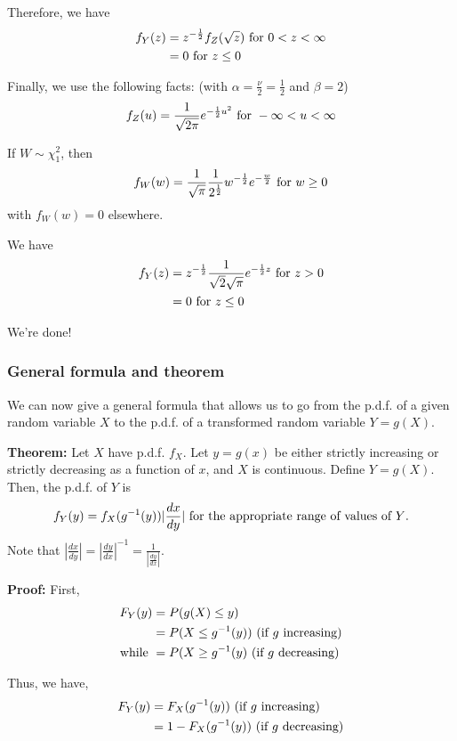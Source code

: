 \documentclass[12pt]{article}
\begin{document}
Therefore, we have
\begin{align*}
    f_Y (z) &= z^{-\frac{1}{2}} f_Z (\sqrt{z}) \textnormal{ for } 0 < z < \infty \\
        &= 0 \textnormal{ for } z \leq 0
\end{align*}

Finally, we use the following facts: (with $\alpha = \frac{\nu}{2} = \frac{1}{2}$ and $\beta = 2$)
\[
    f_Z (u) = \frac{1}{\sqrt{2\pi}} e^{-\frac{1}{2} u^2} \textnormal{ for } -\infty < u < \infty
\]

If $W \sim \chi_1^2$, then
\[
    f_W (w) = \frac{1}{\sqrt{\pi}} \frac{1}{2^{\frac{1}{2}}} w^{-\frac{1}{2}} e^{-\frac{w}{2}} \textnormal{ for } w \geq 0
\]
with $f_W (w) = 0$ elsewhere.

We have
\begin{align*}
    f_Y (z) &= z^{-\frac{1}{2}} \frac{1}{\sqrt{2} \sqrt{\pi}} e^{-\frac{1}{2} z} \textnormal{ for } z > 0 \\
        &= 0 \textnormal{ for } z \leq 0
\end{align*}

We're done!

\subsubsection{General formula and theorem}
We can now give a general formula that allows us to go from the p.d.f. of a given random variable $X$ to the p.d.f. of a transformed random variable $Y = g(X)$.

\textbf{Theorem:} Let $X$ have p.d.f. $f_X$. Let $y = g(x)$ be either strictly increasing or strictly decreasing as a function of $x$, and $X$ is continuous. Define $Y = g(X)$. Then, the p.d.f. of $Y$ is
\[
    f_Y (y) = f_X (g^{-1} (y)) |\frac{dx}{dy}| \textnormal{ for the appropriate range of values of $Y$.}
\]
Note that $\displaystyle |\frac{dx}{dy}| = |\frac{dy}{dx}|^{-1} = \frac{1}{|\frac{dy}{dx}|}$.

\textbf{Proof:} First, 
\begin{align*}
    F_Y (y) &= P(g(X) \leq y) \\
        &= P(X \leq g^{-1}(y)) \textnormal{ (if $g$ increasing)} \\
    \textnormal{while } &= P(X \geq g^{-1}(y) \textnormal{ (if $g$ decreasing)}
\end{align*}

Thus, we have,
\begin{align*}
    F_Y (y) &= F_X (g^{-1} (y)) \textnormal{ (if $g$ increasing)} \\
        &= 1 - F_X (g^{-1} (y)) \textnormal{ (if $g$ decreasing)} 
\end{align*}
\end{document}
